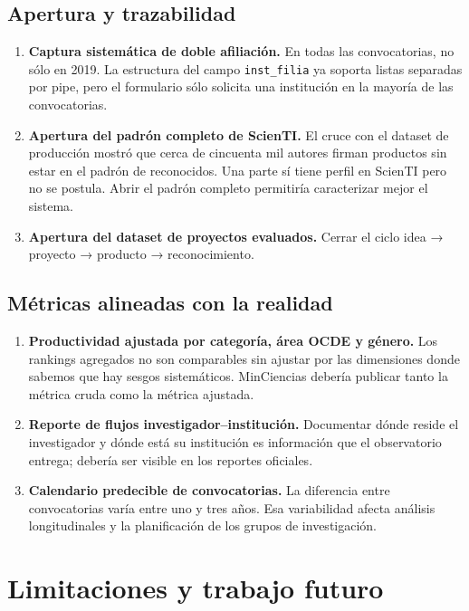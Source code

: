 \documentclass[11pt,a4paper,oneside]{article}
\begin{document}
\subsection{Apertura y trazabilidad}

\begin{enumerate}[label=C.\arabic*., leftmargin=*]
\item \textbf{Captura sistemática de doble afiliación.} En todas las convocatorias, no sólo en 2019. La estructura del campo \texttt{inst\_filia} ya soporta listas separadas por pipe, pero el formulario sólo solicita una institución en la mayoría de las convocatorias.
\item \textbf{Apertura del padrón completo de ScienTI.} El cruce con el dataset de producción mostró que cerca de cincuenta mil autores firman productos sin estar en el padrón de reconocidos. Una parte sí tiene perfil en ScienTI pero no se postula. Abrir el padrón completo permitiría caracterizar mejor el sistema.
\item \textbf{Apertura del dataset de proyectos evaluados.} Cerrar el ciclo idea → proyecto → producto → reconocimiento.
\end{enumerate}

\subsection{Métricas alineadas con la realidad}

\begin{enumerate}[label=D.\arabic*., leftmargin=*]
\item \textbf{Productividad ajustada por categoría, área OCDE y género.} Los rankings agregados no son comparables sin ajustar por las dimensiones donde sabemos que hay sesgos sistemáticos. MinCiencias debería publicar tanto la métrica cruda como la métrica ajustada.
\item \textbf{Reporte de flujos investigador--institución.} Documentar dónde reside el investigador y dónde está su institución es información que el observatorio entrega; debería ser visible en los reportes oficiales.
\item \textbf{Calendario predecible de convocatorias.} La diferencia entre convocatorias varía entre uno y tres años. Esa variabilidad afecta análisis longitudinales y la planificación de los grupos de investigación.
\end{enumerate}

\section{Limitaciones y trabajo futuro}\label{sec:limitaciones}
\end{document}
